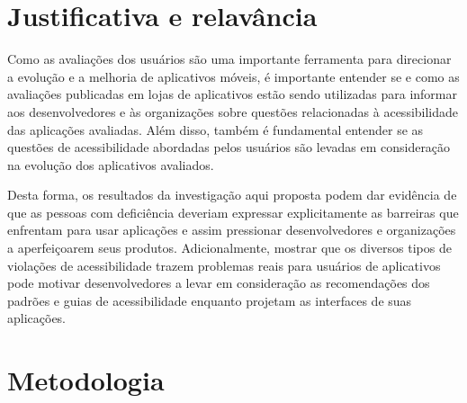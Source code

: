 \section{Justificativa e relavância}

Como as avaliações dos usuários são uma importante ferramenta para direcionar a evolução e a melhoria de aplicativos móveis, 
é importante entender se e como as avaliações publicadas em lojas de aplicativos estão sendo utilizadas para informar aos desenvolvedores e às organizações sobre questões relacionadas à acessibilidade das aplicações avaliadas. 
Além disso, também é fundamental entender se as questões de acessibilidade abordadas pelos usuários são levadas em consideração na evolução dos aplicativos avaliados. 

Desta forma, os resultados da investigação aqui proposta podem dar evidência de que as pessoas com deficiência deveriam expressar explicitamente as barreiras que enfrentam para usar aplicações e assim pressionar desenvolvedores e organizações a aperfeiçoarem seus produtos. 
Adicionalmente, mostrar que os diversos tipos de violações de acessibilidade trazem problemas reais para usuários de aplicativos pode motivar desenvolvedores a levar em consideração as recomendações dos padrões e guias de acessibilidade enquanto projetam as interfaces de suas aplicações.


\section{Metodologia}



